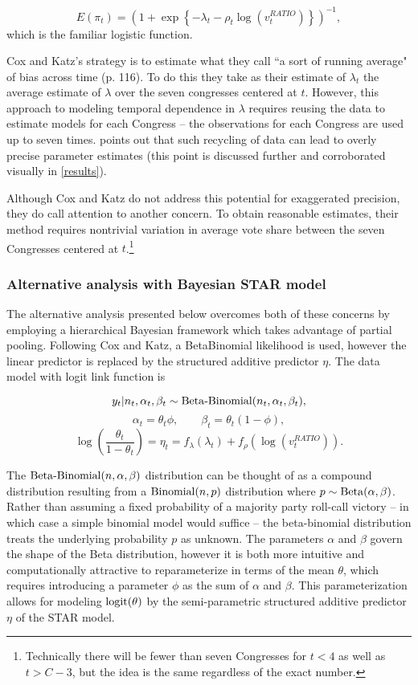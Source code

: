 \begin{equation*}
  E(\pi_t)  = \left(1 + \exp{\left\{- \lambda_t - \rho_t \log{\left( v_t^{RATIO}  \right)}\right\}}\right)^{-1},
\end{equation*}
%
\noindent which is the familiar logistic function. 

Cox and Katz's strategy is to estimate what they call ``a sort of running average" of bias across time (p. 116). To do this they take as their estimate of $\lambda_t$ the average estimate of $\lambda$ over the seven congresses centered at $t$. However, this approach to modeling temporal dependence in $\lambda$ requires reusing the data to estimate models for each Congress -- the observations for each Congress are used up to seven times.   points out that such recycling of data can lead to overly precise parameter estimates (this point is discussed further and corroborated visually in \ref{results}). 

Although Cox and Katz do not address this potential for exaggerated precision, they do call attention to another  concern. To obtain reasonable estimates, their method requires nontrivial variation in average vote share between the seven Congresses centered at $t$.\footnote{Technically there will be fewer than seven Congresses for $t < 4$ as well as $t > C- 3$, but the idea is the same regardless of the exact number.}

\subsubsection{Alternative analysis with Bayesian STAR model}

The alternative analysis presented below overcomes both of these concerns by employing a hierarchical Bayesian framework which takes advantage of partial pooling. Following Cox and Katz, a BetaBinomial likelihood is used, however the linear predictor is replaced by the structured additive predictor $\eta$. The data model with logit link function is 

$$y_t | n_t, \alpha_t, \beta_t \sim {\rm Beta\text{-}Binomial}(n_t, \alpha_t, \beta_t),$$
$$ \alpha_t = \theta_t \phi, \qquad \beta_t = \theta_t (1 - \phi),$$
$$ \log\left({\frac{\theta_t}{1 - \theta_t}}\right) = \eta_t = f_{\lambda}(\lambda_t) + f_\rho \left(\log{(v_t^{RATIO})}\right).$$

The ${\rm Beta\text{-}Binomial}(n,\alpha,\beta)$ distribution can be thought of as a compound distribution resulting from a ${\rm Binomial}(n,p)$ distribution where $p \sim {\rm Beta}(\alpha,\beta)$. Rather than assuming a fixed probability of a majority party roll-call victory -- in which case a simple binomial model would suffice -- the beta-binomial distribution treats the underlying probability $p$ as unknown. The parameters $\alpha$ and $\beta$ govern the shape of the Beta distribution, however it is both more intuitive and computationally attractive to reparameterize in terms of the mean $\theta$, which requires introducing a parameter $\phi$ as the sum of $\alpha$ and $\beta$.  This parameterization allows for modeling ${\rm logit}(\theta)$ by the semi-parametric structured additive predictor $\eta$ of the STAR model. 

